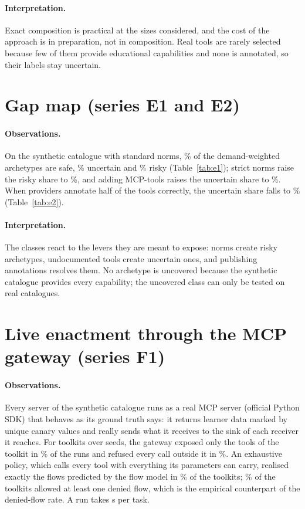 \documentclass[10pt]{article}
\begin{document}
\paragraph{Interpretation.} Exact composition is practical at the sizes considered, and the cost of the approach is in preparation, not in composition. Real tools are rarely selected because few of them provide educational capabilities and none is annotated, so their labels stay uncertain.

\section{Gap map (series E1 and E2)}
\paragraph{Observations.} On the synthetic catalogue with standard norms, \REoneSafeSyn\% of the demand-weighted archetypes are safe, \REoneUncSyn\% uncertain and \REoneRiskStd\% risky (Table~\ref{tab:e1}); strict norms raise the risky share to \REoneRiskStrict\%, and adding MCP-tools raises the uncertain share to \REoneUncMix\%. When providers annotate half of the tools correctly, the uncertain share falls to \REtwoUncHalf\% (Table~\ref{tab:e2}).
\paragraph{Interpretation.} The classes react to the levers they are meant to expose: norms create risky archetypes, undocumented tools create uncertain ones, and publishing annotations resolves them. No archetype is uncovered because the synthetic catalogue provides every capability; the uncovered class can only be tested on real catalogues.



\section{Live enactment through the MCP gateway (series F1)}
\paragraph{Observations.} Every server of the synthetic catalogue runs as a real MCP server (official Python SDK) that behaves as its ground truth says: it returns learner data marked by unique canary values and really sends what it receives to the sink of each receiver it reaches. For \RFoneN{} toolkits over \RFoneSeeds{} seeds, the gateway exposed only the tools of the toolkit in \RFoneExposed\% of the runs and refused every call outside it in \RFoneBlocked\%. An exhaustive policy, which calls every tool with everything its parameters can carry, realised exactly the flows predicted by the flow model in \RFoneExact\% of the toolkits; \RFoneDenied\% of the toolkits allowed at least one denied flow, which is the empirical counterpart of the denied-flow rate. A run takes \RFoneSec{} s per task.
\end{document}
